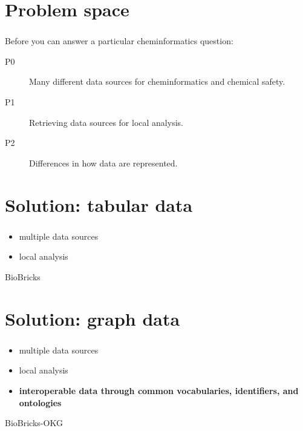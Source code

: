 \documentclass{beamer}
\begin{document}

\frame{\titlepage}

\section{Problem space}
\begin{frame}\frametitle{\secname}
	Before you can answer a particular cheminformatics
	question:
	\begin{description}
		\item[P0] Many different data sources for
			cheminformatics and chemical safety.
		\pause
		\item[P1] Retrieving data sources for local
			analysis.
		\pause
		\item[P2] Differences in how data are represented.
	\end{description}
\end{frame}

\section{Solution: tabular data}
\begin{frame}\frametitle{\secname}
	\begin{itemize}
		\item multiple data sources
		\item local analysis
	\end{itemize}
	\pause
	\begin{center}
		BioBricks
	\end{center}
\end{frame}

\section{Solution: graph data}
\begin{frame}\frametitle{\secname}
	\begin{itemize}
		\item multiple data sources
		\item local analysis
		\pause
		\item \textbf{interoperable data through common
			vocabularies, identifiers, and ontologies}
	\end{itemize}
	\pause
	\begin{center}
		BioBricks-OKG
	\end{center}
\end{frame}
\end{document}
